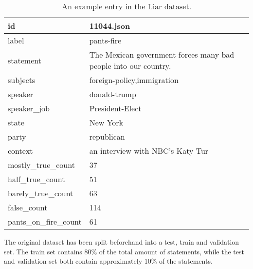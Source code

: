 \begin{table*}[t]
    \centering
    \begin{tabular}{ll}
        \hline
        id                     & 11044.json                                                      \\ \hline
        label                  & pants-fire                                                      \\ \hline
        statement              & The Mexican government forces many bad people into our country. \\ \hline
        subjects               & foreign-policy,immigration                                      \\ \hline
        speaker                & donald-trump                                                    \\ \hline
        speaker\_job           & President-Elect                                                 \\ \hline
        state                  & New York                                                        \\ \hline
        party                  & republican                                                      \\ \hline
        context                & an interview with NBC's Katy Tur                                \\ \hline
        mostly\_true\_count    & 37                                                              \\ \hline
        half\_true\_count      & 51                                                              \\ \hline
        barely\_true\_count    & 63                                                              \\ \hline
        false\_count           & 114                                                             \\ \hline
        pants\_on\_fire\_count & 61                                                              \\ \hline
    \end{tabular}
    \caption{An example entry in the Liar dataset.}
\end{table*}

The original dataset has been split beforehand into a test, train and validation set. 
The train set contains 80\% of the total amount of statements, while the test and validation set both contain approximately 10\% of the statements. 

